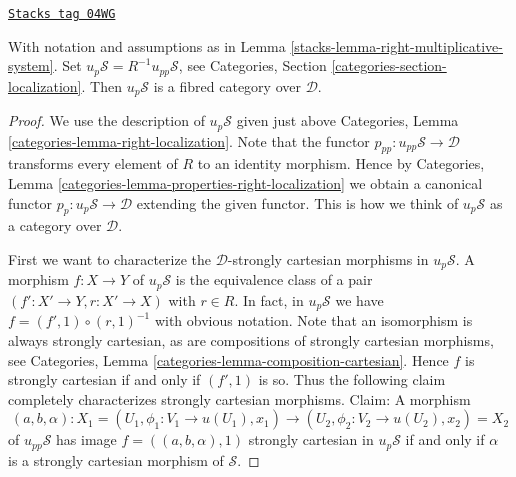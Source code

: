 \begin{lemma}
\label{stacks-lemma-fibred-category-pullback}
\href{https://stacks.math.columbia.edu/tag/04WG}{\texttt{Stacks tag 04WG}}

With notation and assumptions as in
Lemma \ref{stacks-lemma-right-multiplicative-system}.
Set $u_p\mathcal{S} = R^{-1}u_{pp}\mathcal{S}$, see
Categories, Section \ref{categories-section-localization}.
Then $u_p\mathcal{S}$ is a fibred category over $\mathcal{D}$.
\end{lemma}

\begin{proof}
We use the description of $u_p\mathcal{S}$ given just above
Categories, Lemma \ref{categories-lemma-right-localization}.
Note that the functor $p_{pp} : u_{pp}\mathcal{S} \to \mathcal{D}$
transforms every element of $R$ to an identity morphism.
Hence by
Categories, Lemma \ref{categories-lemma-properties-right-localization}
we obtain a canonical functor $p_p : u_p\mathcal{S} \to \mathcal{D}$
extending the given functor. This is how we think of
$u_p\mathcal{S}$ as a category over $\mathcal{D}$.

\medskip\noindent
First we want to characterize the $\mathcal{D}$-strongly cartesian morphisms
in $u_p\mathcal{S}$.
A morphism $f : X \to Y$ of $u_p\mathcal{S}$ is the equivalence class of
a pair $(f' : X' \to Y, r : X' \to X)$ with $r \in R$.
In fact, in $u_p\mathcal{S}$ we have $f = (f', 1) \circ (r, 1)^{-1}$
with obvious notation.
Note that an isomorphism is always strongly cartesian, as are
compositions of strongly cartesian morphisms, see
Categories, Lemma \ref{categories-lemma-composition-cartesian}.
Hence $f$ is strongly cartesian if and only if $(f', 1)$ is so.
Thus the following claim completely characterizes strongly cartesian
morphisms. Claim: A morphism
$$
(a, b, \alpha) :
X_1 = (U_1, \phi_1 : V_1 \to u(U_1), x_1)
\longrightarrow
(U_2, \phi_2 : V_2 \to u(U_2), x_2) = X_2
$$
of $u_{pp}\mathcal{S}$ has image $f = ((a, b, \alpha), 1)$
strongly cartesian in $u_p\mathcal{S}$ if and only if $\alpha$
is a strongly cartesian morphism of $\mathcal{S}$.


\end{proof}
